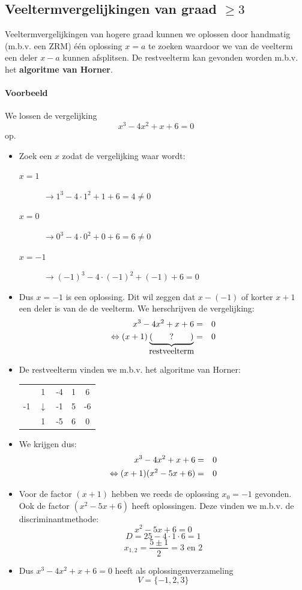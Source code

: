 \documentclass[12pt]{article}
\begin{document}
\begin{theorie}

\pagebreak
\subsection{Veeltermvergelijkingen van graad $\geq 3$}

Veeltermvergelijkingen van hogere graad kunnen we oplossen door handmatig (m.b.v. een ZRM) één oplossing $x=a$ te zoeken waardoor we van de veelterm een deler $x-a$ kunnen afsplitsen. De restveelterm kan gevonden worden m.b.v. het {\bf algoritme van Horner}.

\paragraph{Voorbeeld}

We lossen de vergelijking $$x^3-4x^2+x+6=0$$ op.

\begin{itemize}
\item Zoek een $x$ zodat de vergelijking waar wordt:
  \begin{description}
  \item[$x=1$] $\rightarrow 1^3-4\cdot 1^2+1+6 = 4 \neq 0$
  \item[$x=0$] $\rightarrow 0^3-4\cdot 0^2+0+6 = 6 \neq 0$
  \item[$x=-1$] $\rightarrow (-1)^3-4\cdot (-1)^2+(-1)+6 = 0$
  \end{description}
\item Dus $x=-1$ is een oplossing. Dit wil zeggen dat $x-(-1)$ of korter $x+1$ een deler is van de de veelterm. We herschrijven de vergelijking:
  \begin{eqnarray*}
    x^3-4x^2+x+6&=&0\\
    \Leftrightarrow (x+1)\underbrace{(\qquad ? \qquad)}_{\mbox{restveelterm}}&=&0\\
  \end{eqnarray*}
\item De restveelterm vinden we m.b.v. het algoritme van Horner:
  \begin{center}
    \begin{tabular}{c|cccc}
      & 1 & -4 & 1 & 6\\
      -1 & $\downarrow$ & -1 & 5 & -6\\
      \hline
      & 1 & -5 & 6 & 0
    \end{tabular}
  \end{center}
\item We krijgen dus:
  \begin{eqnarray*}
    x^3-4x^2+x+6&=&0\\
    \Leftrightarrow (x+1)(x^2-5x+6)&=&0\\
  \end{eqnarray*}
\item Voor de factor $(x+1)$ hebben we reeds de oplossing $x_0=-1$ gevonden. Ook de factor $(x^2-5x+6)$ heeft oplossingen. Deze vinden we m.b.v. de discriminantmethode:
  $$x^2-5x+6=0$$
  $$D=25-4\cdot 1\cdot 6=1$$
  $$x_{1,2}=\dfrac{5\pm 1}{2}=3\mbox{ en }2$$
\item Dus $x^3-4x^2+x+6=0$ heeft als oplossingenverzameling
  $$V=\{-1, 2, 3\}$$
\end{itemize}


\end{theorie}
\end{document}
